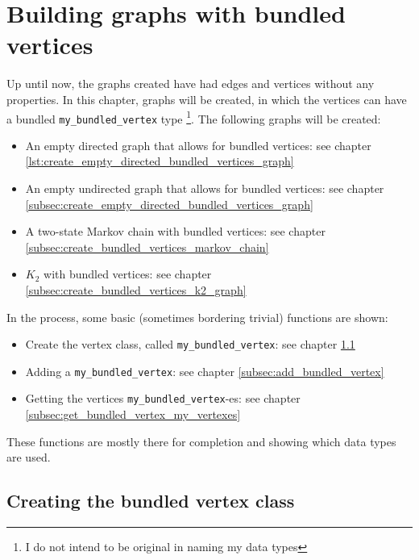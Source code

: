 \chapter{Building graphs with bundled vertices}
\label{sec:Building-graphs-with-bundled-vertices}

Up until now, the graphs created have had edges and vertices without any
properties.
In this chapter, graphs will be created, in which the vertices can have
a bundled \verb;my_bundled_vertex; type
\footnote{I do not intend to be original in naming my data types}.
The following graphs will be created:

\begin{itemize}
  \item An empty directed graph that allows for bundled vertices: 
    see chapter \ref{lst:create_empty_directed_bundled_vertices_graph}
  \item An empty undirected graph that allows for bundled vertices: 
    see chapter \ref{subsec:create_empty_directed_bundled_vertices_graph}
  \item A two-state Markov chain with bundled vertices: 
    see chapter \ref{subsec:create_bundled_vertices_markov_chain}
  \item $K_{2}$ with bundled vertices: 
    see chapter \ref{subsec:create_bundled_vertices_k2_graph}
\end{itemize}

In the process, some basic (sometimes bordering trivial) functions are shown:

\begin{itemize}
  \item 
    Create the vertex class, called \verb;my_bundled_vertex;: 
    see chapter \ref{subsec:my_bundled_vertex}
  \item Adding a \verb;my_bundled_vertex;: 
    see chapter \ref{subsec:add_bundled_vertex}
  \item Getting the vertices \verb;my_bundled_vertex;-es: 
    see chapter \ref{subsec:get_bundled_vertex_my_vertexes}
\end{itemize}

These functions are mostly there for completion and showing which data types
are used.

\section{Creating the bundled vertex class}
\label{subsec:my_bundled_vertex}

